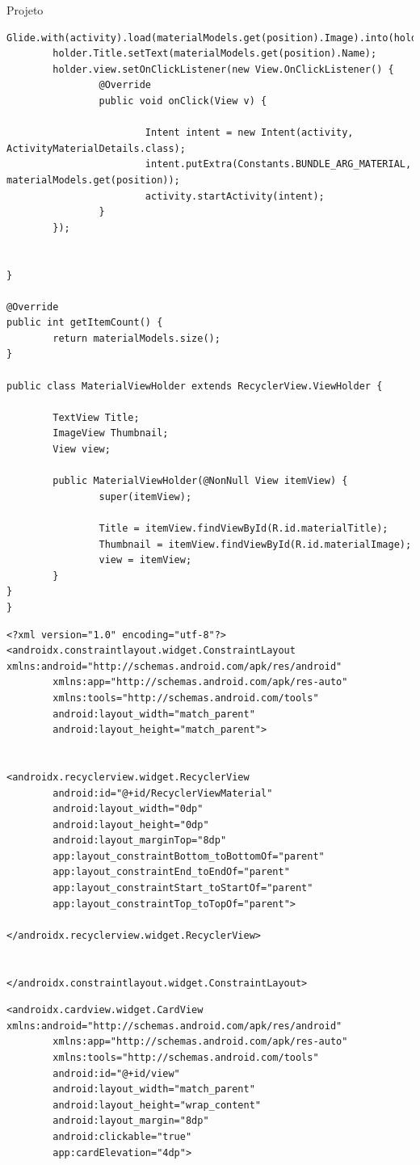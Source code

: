 \documentclass[
	12pt,				%
	openright,			%
	twoside,			%
	a4paper,			%
	english,			%
	french,				%
	spanish,			%
	brazil				%
	]{abntex2}
\begin{document}
\begin{chapter}{Projeto}
\begin{lstlisting}[numbers=none,
basicstyle=\small,
caption={MaterialAdapter.java},
title={MaterialAdapter.java},
label={MaterialAdapter.java}]
		Glide.with(activity).load(materialModels.get(position).Image).into(holder.Thumbnail);
		holder.Title.setText(materialModels.get(position).Name);
		holder.view.setOnClickListener(new View.OnClickListener() {
				@Override
				public void onClick(View v) {

						Intent intent = new Intent(activity, ActivityMaterialDetails.class);
						intent.putExtra(Constants.BUNDLE_ARG_MATERIAL, materialModels.get(position));
						activity.startActivity(intent);
				}
		});


}

@Override
public int getItemCount() {
		return materialModels.size();
}

public class MaterialViewHolder extends RecyclerView.ViewHolder {

		TextView Title;
		ImageView Thumbnail;
		View view;

		public MaterialViewHolder(@NonNull View itemView) {
				super(itemView);

				Title = itemView.findViewById(R.id.materialTitle);
				Thumbnail = itemView.findViewById(R.id.materialImage);
				view = itemView;
		}
}
}

\end{lstlisting}

\begin{lstlisting}[numbers=none,basicstyle=\small,
caption={ActivityMaterial.xml},
title={ActivityMaterial.xml},
label={activity_material.xml}]
<?xml version="1.0" encoding="utf-8"?>
<androidx.constraintlayout.widget.ConstraintLayout xmlns:android="http://schemas.android.com/apk/res/android"
		xmlns:app="http://schemas.android.com/apk/res-auto"
		xmlns:tools="http://schemas.android.com/tools"
		android:layout_width="match_parent"
		android:layout_height="match_parent">


<androidx.recyclerview.widget.RecyclerView
		android:id="@+id/RecyclerViewMaterial"
		android:layout_width="0dp"
		android:layout_height="0dp"
		android:layout_marginTop="8dp"
		app:layout_constraintBottom_toBottomOf="parent"
		app:layout_constraintEnd_toEndOf="parent"
		app:layout_constraintStart_toStartOf="parent"
		app:layout_constraintTop_toTopOf="parent">

</androidx.recyclerview.widget.RecyclerView>


</androidx.constraintlayout.widget.ConstraintLayout>
\end{lstlisting}


\begin{lstlisting}[numbers=none,basicstyle=\small,
caption={MaterialLayout.xml},
title={MaterialLayout.xml},
label={MaterialLayout.xml}]
<androidx.cardview.widget.CardView xmlns:android="http://schemas.android.com/apk/res/android"
		xmlns:app="http://schemas.android.com/apk/res-auto"
		xmlns:tools="http://schemas.android.com/tools"
		android:id="@+id/view"
		android:layout_width="match_parent"
		android:layout_height="wrap_content"
		android:layout_margin="8dp"
		android:clickable="true"
		app:cardElevation="4dp">


\end{lstlisting}
\end{chapter}
\end{document}
